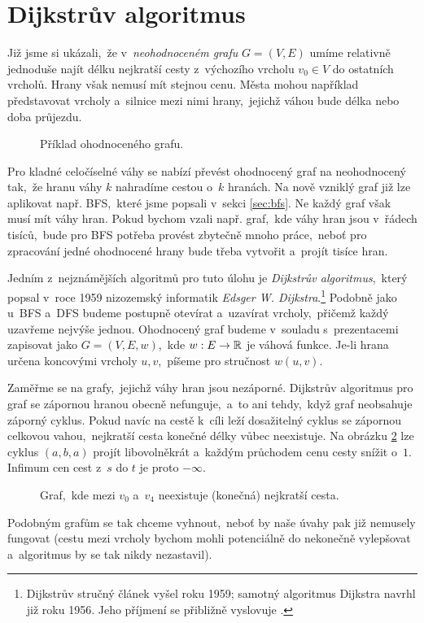 \section{Dijkstrův algoritmus}\label{sec:dijkstra}

Již jsme si ukázali,~že v~\emph{neohodnoceném grafu} $G=(V,E)$ umíme relativně jednoduše najít délku nejkratší cesty z~výchozího vrcholu $v_0\in V$ do ostatních vrcholů. Hrany však nemusí mít stejnou cenu. Města mohou například představovat vrcholy a~silnice mezi nimi hrany,~jejichž váhou bude délka nebo doba průjezdu.
\begin{figure}[ht]
    \centering
    
    \caption{Příklad ohodnoceného grafu.}
    \label{fig:ohod_graf}
\end{figure}
Pro kladné celočíselné váhy se nabízí převést ohodnocený graf na neohodnocený tak,~že hranu váhy $k$ nahradíme cestou o~$k$ hranách. Na nově vzniklý graf již lze aplikovat např. BFS,~které jsme popsali v~sekci \ref{sec:bfs}. Ne každý graf však musí mít  váhy hran. Pokud bychom vzali např. graf,~kde váhy hran jsou v~řádech tisíců,~bude pro BFS potřeba provést zbytečně mnoho práce,~neboť pro zpracování jedné ohodnocené hrany bude třeba vytvořit a~projít tisíce hran.

Jedním z~nejznámějších algoritmů pro tuto úlohu je \emph{Dijkstrův algoritmus},~který popsal v~roce 1959 nizozemský informatik \emph{Edsger W. Dijkstra}.\footnote{Dijkstrův stručný článek vyšel roku 1959; samotný algoritmus Dijkstra navrhl již roku 1956. Jeho příjmení se přibližně vyslovuje .} Podobně jako u~BFS a~DFS budeme postupně otevírat a~uzavírat vrcholy,~přičemž každý uzavřeme nejvýše jednou.
Ohodnocený graf budeme v~souladu s~prezentacemi zapisovat jako $G=(V,E,w)$,~kde $w:E \rightarrow \mathbb{R}$ je váhová funkce. Je-li hrana určena koncovými vrcholy $u,v$,~píšeme pro stručnost $w(u,v)$.

Zaměřme se na grafy,~jejichž váhy hran jsou nezáporné. Dijkstrův algoritmus pro graf se zápornou hranou obecně nefunguje,~a~to ani tehdy,~když graf neobsahuje záporný cyklus. Pokud navíc na cestě k~cíli leží dosažitelný cyklus se zápornou celkovou vahou,~nejkratší cesta konečné délky vůbec neexistuje. Na obrázku \ref{fig:zapor_ohod_graf} lze cyklus $(a,b,a)$ projít libovolněkrát a~každým průchodem cenu cesty snížit o~$1$. Infimum cen cest z~$s$ do $t$ je proto $-\infty$.
\begin{figure}[ht]
    \centering
    
    \caption{Graf,~kde mezi $v_0$ a~$v_4$ neexistuje (konečná) nejkratší cesta.}
    \label{fig:zapor_ohod_graf}
\end{figure}
Podobným grafům se tak chceme vyhnout,~neboť by naše úvahy pak již nemusely fungovat (cestu mezi vrcholy bychom mohli potenciálně do nekonečně vylepšovat a~algoritmus by se tak nikdy nezastavil).

